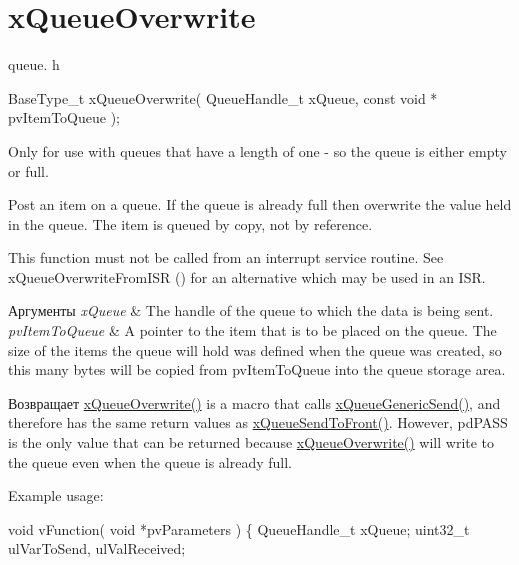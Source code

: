 \hypertarget{group__x_queue_overwrite}{}\section{x\+Queue\+Overwrite}
\label{group__x_queue_overwrite}
queue. h 
\begin{DoxyPre}
 BaseType\_t xQueueOverwrite(
                              QueueHandle\_t xQueue,
                              const void * pvItemToQueue
                         );
   \end{DoxyPre}


Only for use with queues that have a length of one -\/ so the queue is either empty or full.

Post an item on a queue. If the queue is already full then overwrite the value held in the queue. The item is queued by copy, not by reference.

This function must not be called from an interrupt service routine. See x\+Queue\+Overwrite\+From\+I\+SR () for an alternative which may be used in an I\+SR.


\begin{DoxyParams}{Аргументы}
{\em x\+Queue} & The handle of the queue to which the data is being sent.\\
\hline
{\em pv\+Item\+To\+Queue} & A pointer to the item that is to be placed on the queue. The size of the items the queue will hold was defined when the queue was created, so this many bytes will be copied from pv\+Item\+To\+Queue into the queue storage area.\\
\hline
\end{DoxyParams}
\begin{DoxyReturn}{Возвращает}
\mbox{\hyperlink{queue_8h_a8e9ced123b5a0e37a36d3bbdb2e56b4e}{x\+Queue\+Overwrite()}} is a macro that calls \mbox{\hyperlink{queue_8h_a7ce86d1026e0c3055a523935bf53c0b3}{x\+Queue\+Generic\+Send()}}, and therefore has the same return values as \mbox{\hyperlink{queue_8h_aa612fcc2b1ceee0200f34b942e300b41}{x\+Queue\+Send\+To\+Front()}}. However, pd\+P\+A\+SS is the only value that can be returned because \mbox{\hyperlink{queue_8h_a8e9ced123b5a0e37a36d3bbdb2e56b4e}{x\+Queue\+Overwrite()}} will write to the queue even when the queue is already full.
\end{DoxyReturn}
Example usage\+: 
\begin{DoxyPre}\end{DoxyPre}



\begin{DoxyPre} void vFunction( void *pvParameters )
 \{
 QueueHandle\_t xQueue;
 uint32\_t ulVarToSend, ulValReceived;\end{DoxyPre}



